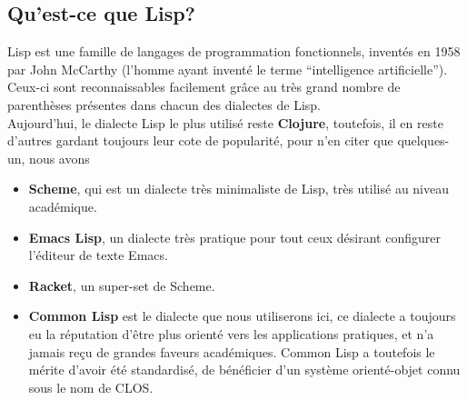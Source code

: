 \documentclass[a4paper, 12pt]{article}
\numberwithin{equation}{subsection}
\begin{document}
\subsection{Qu'est-ce que Lisp?}
Lisp est une famille de langages de programmation fonctionnels, inventés en 1958 par John McCarthy (l'homme ayant inventé le terme ``intelligence artificielle''). \\
Ceux-ci sont reconnaissables facilement grâce au très grand nombre de parenthèses présentes dans chacun des dialectes de Lisp. \\
Aujourd'hui, le dialecte Lisp le plus utilisé reste {\bf Clojure}, toutefois, il en reste d'autres gardant toujours leur cote de popularité, pour n'en citer que quelques-un, nous avons
\begin{itemize}
  \item {\bf Scheme}, qui est un dialecte très minimaliste de Lisp, très utilisé au niveau académique.
  \item {\bf Emacs Lisp}, un dialecte très pratique pour tout ceux désirant configurer l'éditeur de texte Emacs.
  \item {\bf Racket}, un super-set de Scheme.
  \item {\bf Common Lisp} est le dialecte que nous utiliserons ici, ce dialecte a toujours eu la réputation d'être plus orienté vers les applications pratiques, et n'a jamais reçu de grandes faveurs académiques. Common Lisp a toutefois le mérite d'avoir été standardisé, de bénéficier d'un système orienté-objet connu sous le nom de CLOS.
\end{itemize}
\end{document}
